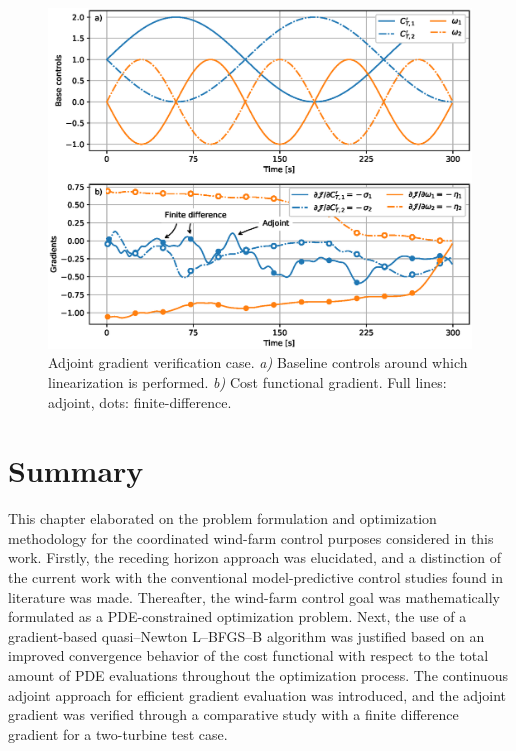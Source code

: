 	\begin{figure}[b]
		\includegraphics[width=\textwidth]{chapters/optimal_control_problem/gradient_verification.eps}
		\caption[Adjoint gradient verification case.]{Adjoint gradient verification case. \emph{a)} Baseline controls around which linearization is performed. \emph{b)} Cost functional gradient. Full lines: adjoint, dots: finite-difference. \label{fig:gradient_verification}}
	\end{figure}

\section{Summary}\label{sec:opt_prob_summ}
This chapter elaborated on the problem formulation and optimization methodology for the coordinated wind-farm control purposes considered in this work. Firstly, the receding horizon approach was elucidated, and a distinction of the current work with the conventional model-predictive control studies found in literature was made. Thereafter, the wind-farm control goal was mathematically formulated as a PDE-constrained optimization problem. Next, the use of a gradient-based quasi--Newton L--BFGS--B algorithm was justified based on an improved convergence behavior of the cost functional with respect to the total amount of PDE evaluations throughout the optimization process. The continuous adjoint approach for efficient gradient evaluation was introduced, and the adjoint gradient was verified through a comparative study with a finite difference gradient for a two-turbine test case. 

